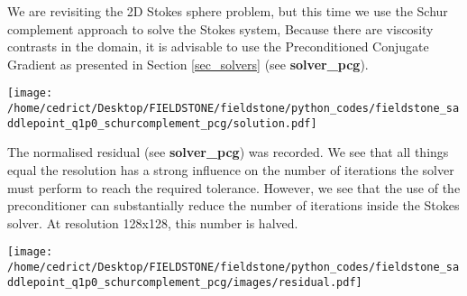 We are revisiting the 2D Stokes sphere problem, but this time 
we use the Schur complement approach to solve the 
Stokes system, 
Because there are viscosity contrasts in the domain, it is advisable 
to use the Preconditioned Conjugate Gradient 
as presented in Section \ref{sec_solvers} (see {\bf solver\_pcg}).


\texttt{[image: /home/cedrict/Desktop/FIELDSTONE/fieldstone/python\_codes/fieldstone\_saddlepoint\_q1p0\_schurcomplement\_pcg/solution.pdf]}

The normalised residual (see {\bf solver\_pcg}) was recorded. We see that 
all things equal the resolution has a strong influence on the number of iterations the solver must
perform to reach the required tolerance. 
However, we see that the use of the preconditioner can substantially reduce the number 
of iterations inside the Stokes solver. At resolution 128x128, this number is halved. 

\texttt{[image: /home/cedrict/Desktop/FIELDSTONE/fieldstone/python\_codes/fieldstone\_saddlepoint\_q1p0\_schurcomplement\_pcg/images/residual.pdf]}
 

